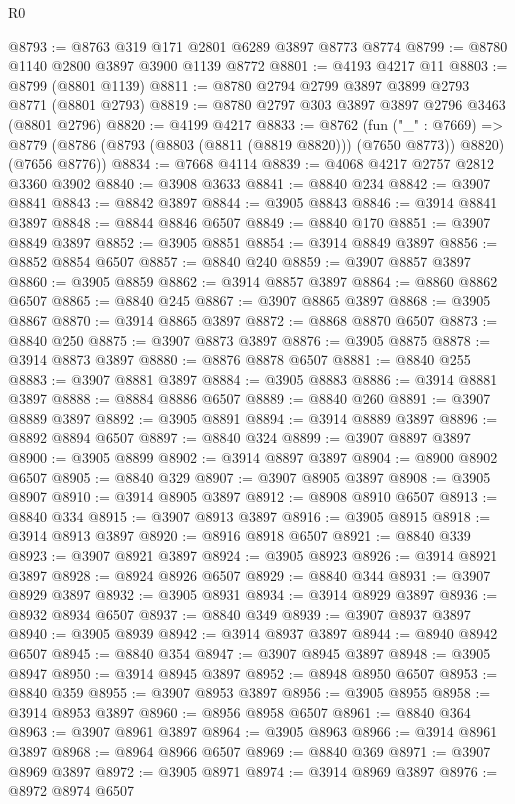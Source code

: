 \begin{lexlean}{R0}
\begin{coremodule}
@8793 := @8763 @319 @171 @2801 @6289 @3897 @8773 @8774
@8799 := @8780 @1140 @2800 @3897 @3900 @1139 @8772
@8801 := @4193 @4217 @11
@8803 := @8799 (@8801 @1139)
@8811 := @8780 @2794 @2799 @3897 @3899 @2793 @8771 (@8801 @2793)
@8819 := @8780 @2797 @303 @3897 @3897 @2796 @3463 (@8801 @2796)
@8820 := @4199 @4217
@8833 := @8762
    (fun ("_" : @7669) =>
    @8779 (@8786 (@8793 (@8803 (@8811 (@8819 @8820))) (@7650 @8773)) @8820) (@7656 @8776))
@8834 := @7668 @4114
@8839 := @4068 @4217 @2757 @2812 @3360 @3902
@8840 := @3908 @3633
@8841 := @8840 @234
@8842 := @3907 @8841
@8843 := @8842 @3897
@8844 := @3905 @8843
@8846 := @3914 @8841 @3897
@8848 := @8844 @8846 @6507
@8849 := @8840 @170
@8851 := @3907 @8849 @3897
@8852 := @3905 @8851
@8854 := @3914 @8849 @3897
@8856 := @8852 @8854 @6507
@8857 := @8840 @240
@8859 := @3907 @8857 @3897
@8860 := @3905 @8859
@8862 := @3914 @8857 @3897
@8864 := @8860 @8862 @6507
@8865 := @8840 @245
@8867 := @3907 @8865 @3897
@8868 := @3905 @8867
@8870 := @3914 @8865 @3897
@8872 := @8868 @8870 @6507
@8873 := @8840 @250
@8875 := @3907 @8873 @3897
@8876 := @3905 @8875
@8878 := @3914 @8873 @3897
@8880 := @8876 @8878 @6507
@8881 := @8840 @255
@8883 := @3907 @8881 @3897
@8884 := @3905 @8883
@8886 := @3914 @8881 @3897
@8888 := @8884 @8886 @6507
@8889 := @8840 @260
@8891 := @3907 @8889 @3897
@8892 := @3905 @8891
@8894 := @3914 @8889 @3897
@8896 := @8892 @8894 @6507
@8897 := @8840 @324
@8899 := @3907 @8897 @3897
@8900 := @3905 @8899
@8902 := @3914 @8897 @3897
@8904 := @8900 @8902 @6507
@8905 := @8840 @329
@8907 := @3907 @8905 @3897
@8908 := @3905 @8907
@8910 := @3914 @8905 @3897
@8912 := @8908 @8910 @6507
@8913 := @8840 @334
@8915 := @3907 @8913 @3897
@8916 := @3905 @8915
@8918 := @3914 @8913 @3897
@8920 := @8916 @8918 @6507
@8921 := @8840 @339
@8923 := @3907 @8921 @3897
@8924 := @3905 @8923
@8926 := @3914 @8921 @3897
@8928 := @8924 @8926 @6507
@8929 := @8840 @344
@8931 := @3907 @8929 @3897
@8932 := @3905 @8931
@8934 := @3914 @8929 @3897
@8936 := @8932 @8934 @6507
@8937 := @8840 @349
@8939 := @3907 @8937 @3897
@8940 := @3905 @8939
@8942 := @3914 @8937 @3897
@8944 := @8940 @8942 @6507
@8945 := @8840 @354
@8947 := @3907 @8945 @3897
@8948 := @3905 @8947
@8950 := @3914 @8945 @3897
@8952 := @8948 @8950 @6507
@8953 := @8840 @359
@8955 := @3907 @8953 @3897
@8956 := @3905 @8955
@8958 := @3914 @8953 @3897
@8960 := @8956 @8958 @6507
@8961 := @8840 @364
@8963 := @3907 @8961 @3897
@8964 := @3905 @8963
@8966 := @3914 @8961 @3897
@8968 := @8964 @8966 @6507
@8969 := @8840 @369
@8971 := @3907 @8969 @3897
@8972 := @3905 @8971
@8974 := @3914 @8969 @3897
@8976 := @8972 @8974 @6507

\end{coremodule}
\end{lexlean}
